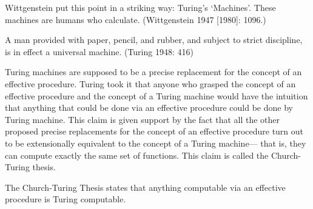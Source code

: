 

Wittgenstein put this point in a striking way:
Turing’s ‘Machines’. These machines are humans who calculate. (Wittgenstein 1947 [1980]: 1096.)


A man provided with paper, pencil, and rubber, and subject to strict discipline, is in effect a universal machine. (Turing 1948: 416)


Turing machines are supposed to be a precise replacement for the concept of
an effective procedure. Turing took it that anyone who grasped the concept of
an effective procedure and the concept of a Turing machine would have the
intuition that anything that could be done via an effective procedure could be
done by Turing machine. This claim is given support by the fact that all the
other proposed precise replacements for the concept of an effective procedure
turn out to be extensionally equivalent to the concept of a Turing machine—
that is, they can compute exactly the same set of functions. This claim is called
the Church-Turing thesis.

\begin{definition}
  The Church-Turing Thesis states that anything computable via an effective procedure is Turing computable.  
\end{definition}



